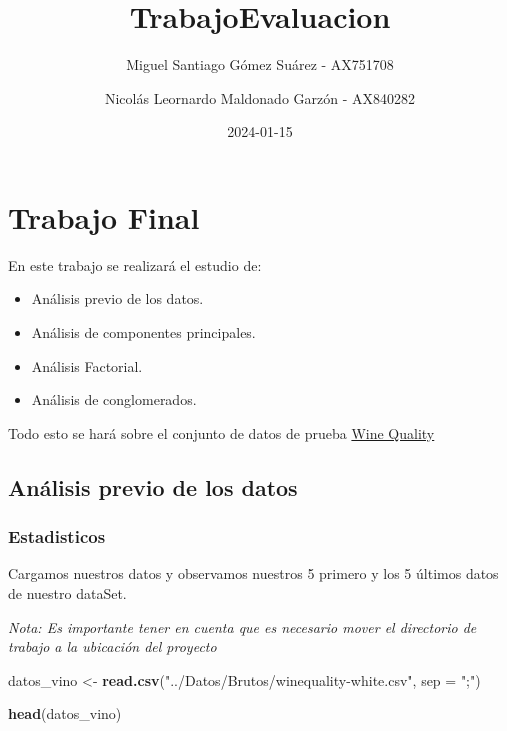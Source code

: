 \documentclass[
]{article}
\title{TrabajoEvaluacion}
\author{Miguel Santiago Gómez Suárez - AX751708 \and Nicolás Leornardo
Maldonado Garzón - AX840282}
\date{2024-01-15}
\newenvironment{Shaded}{\begin{snugshade}}{\end{snugshade}}
\newcommand{\AttributeTok}[1]{\textcolor[rgb]{0.13,0.29,0.53}{#1}}
\newcommand{\FunctionTok}[1]{\textcolor[rgb]{0.13,0.29,0.53}{\textbf{#1}}}
\newcommand{\NormalTok}[1]{#1}
\newcommand{\OtherTok}[1]{\textcolor[rgb]{0.56,0.35,0.01}{#1}}
\newcommand{\StringTok}[1]{\textcolor[rgb]{0.31,0.60,0.02}{#1}}
\providecommand{\tightlist}{%
  \setlength{\itemsep}{0pt}\setlength{\parskip}{0pt}}
\begin{document}
\maketitle

\hypertarget{trabajo-final}{%
\section{Trabajo Final}\label{trabajo-final}}

En este trabajo se realizará el estudio de:

\begin{itemize}
\tightlist
\item
  Análisis previo de los datos.
\item
  Análisis de componentes principales.
\item
  Análisis Factorial.
\item
  Análisis de conglomerados.
\end{itemize}

Todo esto se hará sobre el conjunto de datos de prueba
\href{https://archive.ics.uci.edu/dataset/186/wine+quality}{Wine
Quality}

\hypertarget{anuxe1lisis-previo-de-los-datos}{%
\subsection{Análisis previo de los
datos}\label{anuxe1lisis-previo-de-los-datos}}

\hypertarget{estadisticos}{%
\subsubsection{Estadisticos}\label{estadisticos}}

Cargamos nuestros datos y observamos nuestros 5 primero y los 5 últimos
datos de nuestro dataSet.

\emph{Nota: Es importante tener en cuenta que es necesario mover el
directorio de trabajo a la ubicación del proyecto}

\begin{Shaded}
\begin{Highlighting}[]
\NormalTok{datos\_vino }\OtherTok{\textless{}{-}} \FunctionTok{read.csv}\NormalTok{(}\StringTok{"../Datos/Brutos/winequality{-}white.csv"}\NormalTok{, }\AttributeTok{sep =} \StringTok{";"}\NormalTok{)}

\FunctionTok{head}\NormalTok{(datos\_vino)}
\end{Highlighting}
\end{Shaded}
\end{document}
